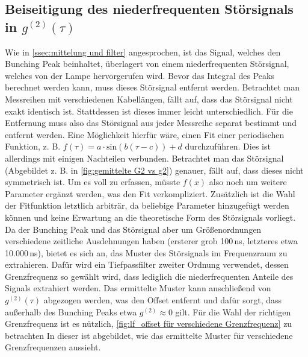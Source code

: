 \subsection{Beiseitigung des niederfrequenten Störsignals in \texorpdfstring{$g^{(2)}(\tau)$}{g2}}
\label{ssec:Beseitigung des niederfrequenten Störsignals}
Wie in \autoref{ssec:mittelung und filter} angesprochen, ist das Signal, welches den Bunching Peak beinhaltet, überlagert von einem niederfrequenten Störsignal, welches von der Lampe hervorgerufen wird. 
Bevor das Integral des Peaks berechnet werden kann, muss dieses Störsignal entfernt werden. 
Betrachtet man Messreihen mit verschiedenen Kabellängen, fällt auf, dass das Störsignal nicht exakt identisch ist. 
Stattdessen ist dieses immer leicht unterschiedlich. 
Für die Entfernung muss also das Störsignal aus jeder Messreihe separat bestimmt und entfernt werden. 
Eine Möglichkeit hierfür wäre, einen Fit einer periodischen Funktion, z. B. $f(\tau) = a\cdot\mathrm{sin}(b(\tau-c))+d$ durchzuführen. 
Dies ist allerdings mit einigen Nachteilen verbunden. 
Betrachtet man das Störsignal (Abgebildet z. B. in \autoref{fig:gemittelte G2 vs g2}) genauer, fällt auf, dass dieses nicht symmetrisch ist. 
Um es voll zu erfassen, müsste $f(x)$ also noch um weitere Parameter ergänzt werden, was den Fit verkompliziert. 
Zusätzlich ist die Wahl der Fitfunktion letztlich arbiträr, da beliebige Parameter hinzugefügt werden können und keine Erwartung an die theoretische Form des Störsignals vorliegt. \\
Da der Bunching Peak und das Störsignal aber um Größenordnungen verschiedene zeitliche Ausdehnungen haben (ersterer grob 100\,ns, letzteres etwa 10{.}000\,ns), bietet es sich an, das Muster des Störsignals im Frequenzraum zu extrahieren. 
Dafür wird ein Tiefpassfilter zweiter Ordnung verwendet, dessen Grenzfrequenz so gewählt wird, dass lediglich die niederfrequenten Anteile des Signals extrahiert werden. 
Das ermittelte Muster kann anschließend von $g^{(2)}(\tau)$ abgezogen werden, was den Offset entfernt und dafür sorgt, dass außerhalb des Bunching Peaks etwa $g^{(2)}\approx 0$ gilt. 
Für die Wahl der richtigen Grenzfrequenz ist es nützlich, \autoref{fig:lf_offset für verschiedene Grenzfrequenz} zu betrachten
In dieser ist abgebildet, wie das ermittelte Muster für verschiedene Grenzfrequenzen aussieht. 

